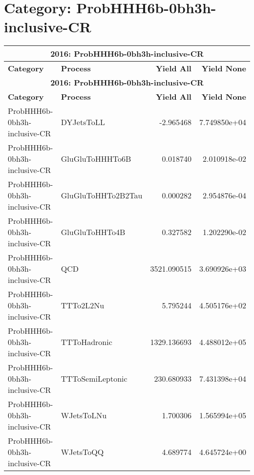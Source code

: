\documentclass{article}
\begin{document}
\section*{Category: ProbHHH6b-0bh3h-inclusive-CR}
\begin{longtable}[c]{|l|l|r|r|}
\hline
\multicolumn{4}{|c|}{\textbf{2016: ProbHHH6b-0bh3h-inclusive-CR}} \\
\hline
\textbf{Category} & \textbf{Process} & \textbf{Yield All} & \textbf{Yield None} \\
\hline
\endfirsthead
\hline
\multicolumn{4}{|c|}{\textbf{2016: ProbHHH6b-0bh3h-inclusive-CR}} \\
\hline
\textbf{Category} & \textbf{Process} & \textbf{Yield All} & \textbf{Yield None} \\
\hline
\endhead
ProbHHH6b-0bh3h-inclusive-CR & DYJetsToLL & -2.965468 & 7.749850e+04 \\
\hline
ProbHHH6b-0bh3h-inclusive-CR & GluGluToHHHTo6B & 0.018740 & 2.010918e-02 \\
\hline
ProbHHH6b-0bh3h-inclusive-CR & GluGluToHHTo2B2Tau & 0.000282 & 2.954876e-04 \\
\hline
ProbHHH6b-0bh3h-inclusive-CR & GluGluToHHTo4B & 0.327582 & 1.202290e-02 \\
\hline
ProbHHH6b-0bh3h-inclusive-CR & QCD & 3521.090515 & 3.690926e+03 \\
\hline
ProbHHH6b-0bh3h-inclusive-CR & TTTo2L2Nu & 5.795244 & 4.505176e+02 \\
\hline
ProbHHH6b-0bh3h-inclusive-CR & TTToHadronic & 1329.136693 & 4.488012e+05 \\
\hline
ProbHHH6b-0bh3h-inclusive-CR & TTToSemiLeptonic & 230.680933 & 7.431398e+04 \\
\hline
ProbHHH6b-0bh3h-inclusive-CR & WJetsToLNu & 1.700306 & 1.565994e+05 \\
\hline
ProbHHH6b-0bh3h-inclusive-CR & WJetsToQQ & 4.689774 & 4.645724e+00 \\
\hline
\end{longtable}
\end{document}
